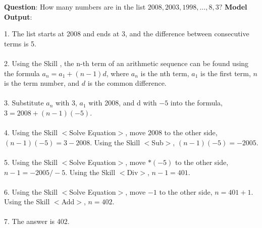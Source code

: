 \documentclass{article} %
\begin{document}
\begin{tcolorbox}[title = {MATH}, colback = Apricot!25!white, colframe = BrickRed!75!black] 
\textbf{Question}: How many numbers are in the list $2008, 2003, 1998, \ldots, 8, 3?$
\tcblower
\textbf{Model Output}:


\quad


1. The list starts at 2008 and ends at 3, and the difference between consecutive terms is 5. \\ \\
2. Using the Skill , the n-th term of an arithmetic sequence can be found using the formula $a_n = a_1 + (n - 1)d$, where $a_n$ is the nth term, $a_1$ is the first term, $n$ is the term number, and $d$ is the common difference. \\ \\
3. Substitute $a_n$ with 3, $a_1$ with 2008, and d with $-5$ into the formula, $3 = 2008 + (n - 1)(-5)$. \\ \\
4. Using the Skill $<$Solve Equation$>$, move $2008$ to the other side, $(n - 1)(-5) = 3 - 2008$. Using the Skill $<$Sub$>$, $(n - 1)(-5) = -2005$. \\ \\
5. Using the Skill $<$Solve Equation$>$, move $*(-5)$ to the other side, $n - 1 = -2005 / -5$.  Using the Skill $<$Div$>$, $n - 1 = 401$. \\ \\
6. Using the Skill $<$Solve Equation$>$, move $-1$ to the other side, $n = 401 + 1$.  Using the Skill $<$Add$>$, $n = 402$. \\ \\
7. The answer is 402. \\
\end{tcolorbox}
\noindent\begin{minipage}{\textwidth}
 \label{Tab:example_compose_math_skill_2}
\end{minipage}


\newpage
\end{document}

